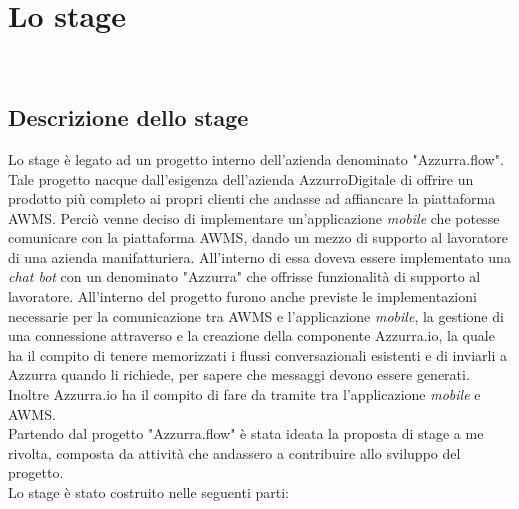 
\chapter{Lo stage}
\label{cap:descrizione-stage}

\\

\section{Descrizione dello stage}
Lo stage è legato ad un progetto interno dell'azienda denominato "Azzurra.flow". Tale progetto nacque dall'esigenza dell'azienda AzzurroDigitale di offrire un prodotto più completo ai propri clienti che andasse ad affiancare la piattaforma \gls{AWMS}. Perciò venne deciso di implementare un’applicazione \emph{mobile} che potesse comunicare con la piattaforma \gls{AWMS}, dando un mezzo di supporto al lavoratore di una azienda manifatturiera. All'interno di essa doveva essere implementato una \emph{chat bot} con un  denominato "Azzurra" che offrisse funzionalità di supporto al lavoratore. All'interno del progetto furono anche previste le implementazioni necessarie per la comunicazione tra \gls{AWMS} e l'applicazione \emph{mobile}, la gestione di una connessione attraverso  e la creazione della componente Azzurra.io, la quale ha il compito di tenere memorizzati i flussi conversazionali esistenti e di inviarli a Azzurra quando li richiede, per sapere che messaggi devono essere generati. Inoltre Azzurra.io ha il compito di fare da tramite tra l'applicazione \emph{mobile} e \gls{AWMS}.\\
Partendo dal progetto "Azzurra.flow" è stata ideata la proposta di stage a me rivolta, composta da attività che andassero a contribuire allo sviluppo del progetto. \\
Lo stage è stato costruito nelle seguenti parti:

